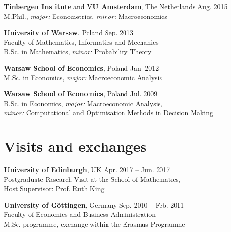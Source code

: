 \documentclass[margin,line]{resume}
\begin{document}
\begin{resume}
    \textbf{Tinbergen Institute} and \textbf{VU Amsterdam}, The Netherlands  \hfill Aug. 2015 	\\
	M.Phil., \textit{major:} Econometrics, \textit{minor:} Macroeconomics 
\vspace{-1mm}

	\textbf{University of Warsaw}, Poland  \hfill Sep. 2013 	
	\vspace{1mm}\\
	Faculty of Mathematics, Informatics and Mechanics \\B.Sc. in Mathematics, 		\textit{minor:} Probability Theory 
\vspace{-1mm}

	\textbf{Warsaw School of Economics}, Poland   \hfill  Jan. 2012\\
	M.Sc. in Economics, \textit{major:} Macroeconomic Analysis
\vspace{-1mm}

 	\textbf{Warsaw School of Economics}, Poland  \hfill  Jul. 2009\\
   	B.Sc. in Economics, \textit{major:} Macroeconomic Analysis,\\ 
    \textit{minor:} Computational and Optimisation Methods in Decision Making\\

\vspace{-4mm}
    
\section{\mysidestyle Visits and exchanges}
    \textbf{University of Edinburgh},  UK \hfill Apr. 2017 -- Jun. 2017\\
	Postgraduate Research Visit at the School of Mathematics,\\ 
    Host Supervisor: Prof. Ruth King
  
    \vspace{-1mm}

	\textbf{University of G{\"o}ttingen}, Germany   \hfill Sep. 2010 -- Feb. 2011	\\
    Faculty of Economics and Business Administration \\M.Sc. programme, exchange within the Erasmus Programme
        



\end{resume}
\end{document}

